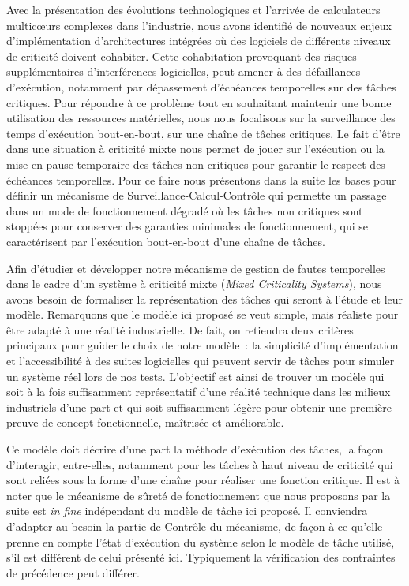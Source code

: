 \documentclass[french, a4paper, 11pt, twoside, pdftex]{StyleThese}
\begin{document}
    Avec la présentation des évolutions technologiques et l'arrivée de calculateurs multicœurs complexes dans l'industrie, nous avons identifié de nouveaux enjeux d'implémentation d'architectures intégrées où des logiciels de différents niveaux de criticité doivent cohabiter. Cette cohabitation provoquant des risques supplémentaires d'interférences logicielles, peut amener à des défaillances d'exécution, notamment par dépassement d'échéances temporelles sur des tâches critiques. Pour répondre à ce problème tout en souhaitant maintenir une bonne utilisation des ressources matérielles, nous nous focalisons sur la surveillance des temps d'exécution bout-en-bout, sur une chaîne de tâches critiques. Le fait d'être dans une situation à criticité mixte nous permet de jouer sur l'exécution ou la mise en pause temporaire des tâches non critiques pour garantir le respect des échéances temporelles. Pour ce faire nous présentons dans la suite les bases pour définir un mécanisme de Surveillance-Calcul-Contrôle qui permette un passage dans un mode de fonctionnement dégradé où les tâches non critiques sont stoppées pour conserver des garanties minimales de fonctionnement, qui se caractérisent par l'exécution bout-en-bout d'une chaîne de tâches.
    
    Afin d'étudier et développer notre mécanisme de gestion de fautes temporelles dans le cadre d'un système à criticité mixte (\textit{Mixed Criticality Systems}), nous avons besoin de formaliser la représentation des tâches qui seront à l'étude et leur modèle. Remarquons que le modèle ici proposé se veut simple, mais réaliste pour être adapté à une réalité industrielle. De fait, on retiendra deux critères principaux pour guider le choix de notre modèle~: la simplicité d'implémentation et l'accessibilité à des suites logicielles qui peuvent servir de tâches pour simuler un système réel lors de nos tests. L'objectif est ainsi de trouver un modèle qui soit à la fois suffisamment représentatif d'une réalité technique dans les milieux industriels d'une part et qui soit suffisamment légère pour obtenir une première preuve de concept fonctionnelle, maîtrisée et améliorable.
    
    
    Ce modèle doit décrire d'une part la méthode d'exécution des tâches, la façon d'interagir, entre-elles, notamment pour les tâches à haut niveau de criticité qui sont reliées sous la forme d'une chaîne pour réaliser une fonction critique. Il est à noter que le mécanisme de sûreté de fonctionnement que nous proposons par la suite est \textit{in fine} indépendant du modèle de tâche ici proposé. Il conviendra d'adapter au besoin la partie de Contrôle du mécanisme, de façon à ce qu'elle prenne en compte l'état d'exécution du système selon le modèle de tâche utilisé, s'il est différent de celui présenté ici. Typiquement la vérification des contraintes de précédence peut différer.
    
\end{document}
